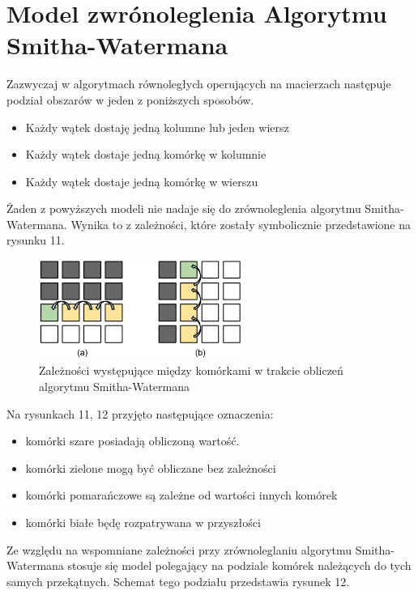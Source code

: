 \documentclass[a4paper,12pt]{article}
\newenvironment{lista}{
\begin{itemize}
  \setlength{\itemsep}{1pt}
  \setlength{\parskip}{0pt}
  \setlength{\parsep}{0pt}
}{\end{itemize}}
\begin{document}
\section*{Model zwrónoleglenia Algorytmu Smitha-Watermana}
Zazwyczaj w algorytmach równoległych operujących na macierzach następuje podział obszarów w jeden z poniższych sposobów. 
\begin{lista}
\item Każdy wątek dostaję jedną kolumne lub jeden wiersz
\item Każdy wątek dostaje jedną komórkę w kolumnie
\item Każdy wątek dostaje jedną komórkę w wierszu
\end{lista}

Żaden z powyższych modeli nie nadaje się do zrównoleglenia algorytmu Smitha-Watermana. Wynika to z zależności, które zostały symbolicznie przedstawione na rysunku 11.

\begin{figure}[H]
  \vspace{5pt}
  \centering
  \begin{center}
  \includegraphics[width=0.6\textwidth]{images/ZleModeleZrownoleglenia.png}
  \end{center}
  \caption{Zależności występujące między komórkami w trakcie obliczeń algorytmu Smitha-Watermana}
 \end{figure}


Na rysunkach 11, 12 przyjęto następujące oznaczenia: 
\begin{lista}
\item komórki szare posiadają obliczoną wartość.
\item komórki zielone mogą być obliczane bez zależności
\item komórki pomarańczowe są zależne od wartości innych komórek
\item komórki białe będę rozpatrywana w przyszłości
\end{lista} 

Ze względu na wspomniane zależności przy zrównoleglaniu algorytmu Smitha-Watermana stosuje się model polegający na podziale komórek należących do tych samych przekątnych. Schemat tego podziału przedstawia rysunek 12.
\end{document}
